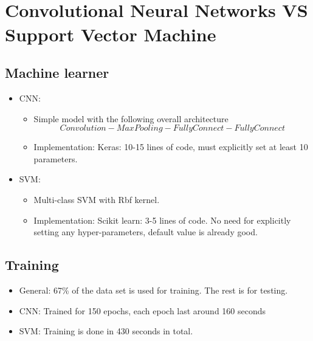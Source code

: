 \documentclass[paper=a4, fontsize=11pt]{scrartcl} %
\title{\hmwkClass \\
       \hmwkTitle}
\author{\hmwkAuthorFullName}
\date{\hmwkDueDate}
\begin{document}
    \maketitle
    \thispagestyle{fancy} %

\section*{Convolutional Neural Networks VS Support Vector Machine}
    \subsection*{Machine learner}	
   	\begin{itemize}
   		\item CNN: 
   		\begin{itemize}
   			\item Simple model with the following overall architecture
   			\[Convolution - MaxPooling - FullyConnect - FullyConnect\] 
   			\item Implementation: Keras: 10-15 lines of code, must explicitly set at least 10 parameters.
   		\end{itemize}
   		\item SVM: 
   		\begin{itemize}
   			\item Multi-class SVM with Rbf kernel.
   			\item Implementation: Scikit learn: 3-5 lines of code. No need for explicitly setting any hyper-parameters, default value is already good.
   		\end{itemize}
  	\end{itemize}

    \subsection*{Training}
	\begin{itemize}
		\item General: 67\% of the data set is used for training. The rest is for testing.
		\item CNN: Trained for 150 epochs, each epoch last around 160 seconds
		\item SVM: Training is done in 430 seconds in total.
	\end{itemize}
\end{document}
